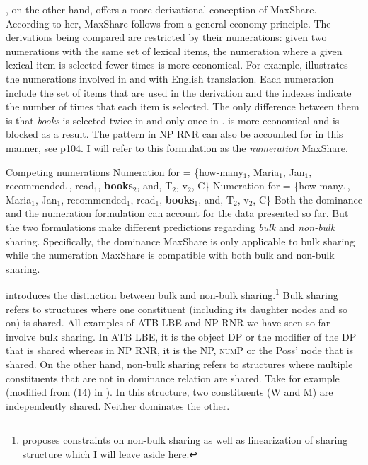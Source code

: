 \documentclass[output=paper]{langscibook}
\begin{document}
\citet{Citko:2006}, on the other hand, offers a more derivational conception of MaxShare. According to her, MaxShare follows from a general economy principle. The derivations being compared are restricted by their numerations: given two numerations with the same set of lexical items, the numeration where a given lexical item is selected fewer times is more economical. For example,  illustrates the numerations involved in  and  with English translation. Each numeration include the set of items that are used in the derivation and the indexes indicate the number of times that each item is selected. The only difference between them is that \textit{books} is selected twice in  and only once in .  is more economical and  is blocked as a result. 
The pattern in NP RNR can also be accounted for in this manner, see \citet{Shen:2018a} p104. I will refer to this formulation as the \textit{numeration} MaxShare.

\ea 
	\label{shenshenex12}
	Competing numerations
	\ea 
		\label{shenshenex12:a}
		Numeration for  = \{how-many$_1$, Maria$_1$, Jan$_1$, recommended$_1$, read$_1$, \textbf{books$_2$}, and, T$_2$, v$_2$, C\}
	\ex 
		\label{shenshenex12:b}
		Numeration for  = \{how-many$_1$, Maria$_1$, Jan$_1$, recommended$_1$, read$_1$, \textbf{books$_1$}, and, T$_2$, v$_2$, C\} 
	\z 
\z 
Both the dominance and the numeration formulation can account for the data presented so far. 
But the two formulations make different predictions regarding \textit{bulk} and \textit{non-bulk} sharing. 
Specifically, the dominance MaxShare is only applicable to bulk sharing while the numeration MaxShare is compatible with both bulk and non-bulk sharing. 

\citet{Gracanin-Yuksek:2007} introduces the distinction between bulk and non-bulk sharing.\footnote{\citet{Gracanin-Yuksek:2007} proposes constraints on non-bulk sharing as well as linearization of sharing structure which I will leave aside here.} 
Bulk sharing refers to structures where one constituent (including its daughter nodes and so on) is shared. 
All examples of ATB LBE and NP RNR we have seen so far involve bulk sharing. 
In ATB LBE, it is the object DP or the modifier of the DP that is shared whereas in NP RNR, it is the NP, \textsc{num}P or the Poss' node that is shared. 
On the other hand, non-bulk sharing refers to structures where multiple constituents that are not in dominance relation are shared. 
Take  for example (modified from (14) in \citealt{Gracanin-Yuksek:2007}). 
In this structure, two constituents (W and M) are independently shared. 
Neither dominates the other. 
\end{document}

